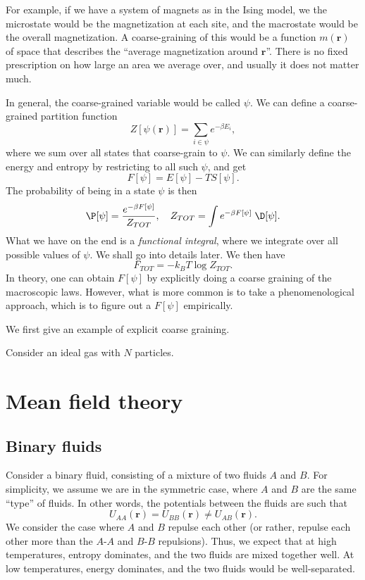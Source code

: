 \documentclass[a4paper]{article}
\begin{document}
For example, if we have a system of magnets as in the Ising model, we the microstate would be the magnetization at each site, and the macrostate would be the overall magnetization. A coarse-graining of this would be a function $m(\mathbf{r})$ of space that describes the ``average magnetization around $\mathbf{r}$''. There is no fixed prescription on how large an area we average over, and usually it does not matter much.

In general, the coarse-grained variable would be called $\psi$. We can define a coarse-grained partition function
\[
  Z[\psi(\mathbf{r})] = \sum_{i \in \psi} e^{-\beta E_i},
\]
where we sum over all states that coarse-grain to $\psi$. We can similarly define the energy and entropy by restricting to all such $\psi$, and get
\[
  F[\psi] = E[\psi] - T S[\psi].
\]
The probability of being in a state $\psi$ is then
\[
  \P[\psi] = \frac{e^{-\beta F[\psi]}}{Z_{TOT}},\quad Z_{TOT} = \int e^{-\beta F[\psi]} \;\D [\psi].
\]
What we have on the end is a \emph{functional integral}, where we integrate over all possible values of $\psi$. We shall go into details later. We then have
\[
  F_{TOT} = -k_B T \log Z_{TOT}.
\]
In theory, one can obtain $F[\psi]$ by explicitly doing a coarse graining of the macroscopic laws. However, what is more common is to take a phenomenological approach, which is to figure out a $F[\psi]$ empirically.

We first give an example of explicit coarse graining.
\begin{eg}
  Consider an ideal gas with $N$ particles.
\end{eg}

\section{Mean field theory}
\subsection{Binary fluids}
Consider a binary fluid, consisting of a mixture of two fluids $A$ and $B$. For simplicity, we assume we are in the symmetric case, where $A$ and $B$ are the same ``type'' of fluids. In other words, the potentials between the fluids are such that
\[
  U_{AA}(\mathbf{r}) = U_{BB}(\mathbf{r}) \not= U_{AB}(\mathbf{r}).
\]
We consider the case where $A$ and $B$ repulse each other (or rather, repulse each other more than the $A$-$A$ and $B$-$B$ repulsions). Thus, we expect that at high temperatures, entropy dominates, and the two fluids are mixed together well. At low temperatures, energy dominates, and the two fluids would be well-separated.
\end{document}
